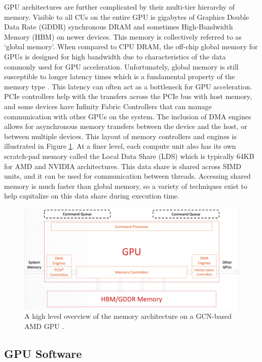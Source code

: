 \quad GPU architectures are further complicated by their multi-tier hierarchy of memory. Visible to all CUs on the entire GPU is gigabytes of Graphics Double Data Rate (GDDR) synchronous DRAM and sometimes High-Bandwidth Memory (HBM) on newer devices. This memory is collectively referred to as `global memory'. When compared to CPU DRAM, the off-chip global memory for GPUs is designed for high bandwidth due to characteristics of the data commonly used for GPU acceleration. Unfortunately, global memory is still susceptible to longer latency times which is a fundamental property of the memory type \cite{greenBook, pycuda}. This latency can often act as a bottleneck for GPU acceleration. PCIe controllers help with the transfers across the PCIe bus with host memory, and some devices have Infinity Fabric Controllers that can manage communication with other GPUs on the system. The inclusion of DMA engines allows for asynchronous memory transfers between the device and the host, or between multiple devices. This layout of memory controllers and engines is illustrated in Figure \ref{gcn3}. At a finer level, each compute unit also has its own scratch-pad memory called the Local Data Share (LDS) which is typically 64KB for AMD and NVIDIA architectures. This data share is shared across SIMD units, and it can be used for communication between threads. Accessing shared memory is much faster than global memory, so a variety of techniques exist to help capitalize on this data share during execution time.

\begin{figure}[hbtp]
\includegraphics[width=\textwidth]{figures/gcn3.png}
\centering
\caption{A high level overview of the memory architecture on a GCN-based AMD GPU \cite{amdConferenceTalk}.}
\label{gcn3}
\end{figure}

\subsection{GPU Software}

